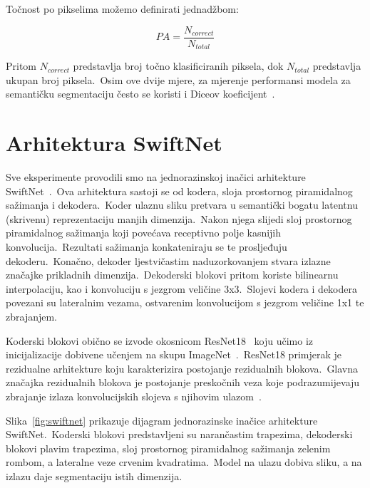 \documentclass[times, utf8, seminar, numeric]{fer}
\begin{document}
Točnost po pikselima možemo definirati jednadžbom:

\begin{equation}
    PA = \frac{N_{correct}}{N_{total}}
    \label{eq:pa}
\end{equation}

Pritom $N_{correct}$ predstavlja broj točno klasificiranih piksela, dok $N_{total}$ predstavlja ukupan broj piksela.\ 
Osim ove dvije mjere, za mjerenje performansi modela za semantičku segmentaciju često se koristi i Diceov koeficijent~\cite{dice1945measures}.

\section{Arhitektura SwiftNet}

Sve eksperimente provodili smo na jednorazinskoj inačici arhitekture SwiftNet~\cite{orvsic2021efficient}.\ Ova arhitektura sastoji se od kodera, sloja prostornog piramidalnog sažimanja i dekodera.\ 
Koder ulaznu sliku pretvara u semantički bogatu latentnu (skrivenu) reprezentaciju manjih dimenzija.\ 
Nakon njega slijedi sloj prostornog piramidalnog sažimanja koji povećava receptivno polje kasnijih konvolucija.\ Rezultati sažimanja konkateniraju se te prosljeđuju dekoderu.\
Konačno, dekoder ljestvičastim naduzorkovanjem stvara izlazne značajke prikladnih dimenzija.\
Dekoderski blokovi pritom koriste bilinearnu interpolaciju, kao i konvoluciju s jezgrom veličine 3x3.\
Slojevi kodera i dekodera povezani su lateralnim vezama, ostvarenim konvolucijom s jezgrom veličine 1x1 te zbrajanjem.\
  
Koderski blokovi obično se izvode okosnicom ResNet18~\cite{he2016deep} koju učimo iz inicijalizacije dobivene učenjem na skupu ImageNet~\cite{deng2009imagenet}.\ 
ResNet18 primjerak je rezidualne arhitekture koju karakterizira postojanje rezidualnih blokova.\ 
Glavna značajka rezidualnih blokova je postojanje preskočnih veza koje podrazumijevaju zbrajanje izlaza konvolucijskih slojeva s njihovim ulazom~\cite{he2016deep}.\
  
Slika~\ref{fig:swiftnet} prikazuje dijagram jednorazinske inačice arhitekture SwiftNet.\ 
Koderski blokovi predstavljeni su narančastim trapezima, dekoderski blokovi plavim trapezima, sloj prostornog piramidalnog sažimanja zelenim rombom, a lateralne veze crvenim kvadratima.\ 
Model na ulazu dobiva sliku, a na izlazu daje segmentaciju istih dimenzija.\
\end{document}
